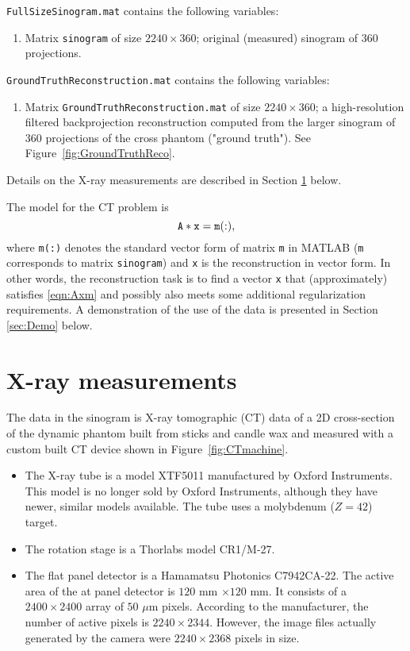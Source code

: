 \documentclass[a4paper,12pt]{article}
\begin{document}
{\bigskip\noindent
{\tt FullSizeSinogram.mat} contains the following variables:
\begin{enumerate}
\item Matrix {\tt sinogram} of size $2240\times 360$; original (measured) sinogram
of 360 projections.
\end{enumerate}

\bigskip\noindent
{\tt GroundTruthReconstruction.mat} contains the following variables:
\begin{enumerate}
\item Matrix {\tt GroundTruthReconstruction.mat} of size $2240\times 360$; a high-resolution filtered backprojection
reconstruction computed from the larger sinogram of 360 projections of the cross phantom ("ground truth"). See Figure~\ref{fig:GroundTruthReco}. 
\end{enumerate}


\bigskip\noindent
Details on the X-ray measurements are described in Section \ref{sec:Measurements} below.

The model for the CT problem is
\begin{equation}\label{eqn:Axm}
 {\tt A*x=m(:)},
\end{equation}
where {\tt m(:)} denotes the standard vector form of matrix {\tt m} in MATLAB ({\tt m} corresponds to matrix {\tt sinogram}) and {\tt x} is the reconstruction in vector form. In other words, the reconstruction task is to find a vector {\tt x} that (approximately) satisfies \eqref{eqn:Axm} and possibly also meets some additional regularization requirements.
A demonstration of the use of the data is presented in Section \ref{sec:Demo} below.





\section{X-ray measurements}\label{sec:Measurements}
The data in the sinogram is X-ray tomographic (CT) data of a 2D cross-section of the dynamic phantom built from sticks and candle wax and measured with a custom built CT device shown in Figure~\ref{fig:CTmachine}. 
\begin{itemize}
\item The X-ray tube is a model XTF5011 manufactured by Oxford Instruments. This model is no longer sold by Oxford Instruments, although they have newer, similar models available. The tube uses a molybdenum ($Z = 42$) target. 
\item The rotation stage is a Thorlabs model CR1/M-27.
\item The flat panel detector is a Hamamatsu Photonics C7942CA-22. The active area of the 
at panel detector is $120$ mm $\times 120$ mm. It consists of a $2400 \times 2400$ array of $50$ $\mu$m pixels. According to the manufacturer, the number of active pixels is  $2240 \times 2344$. However, the image files actually generated by the camera were $2240 \times 2368$ pixels in size.
\end{itemize}

}
\end{document}
